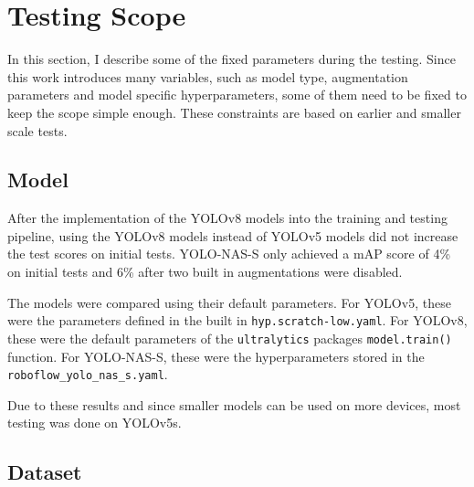 \documentclass[10pt]{book}
\begin{document}
\section{Testing Scope}

In this section, I describe some of the fixed parameters during the testing. Since this work introduces many variables, such as model type, augmentation parameters and model specific hyperparameters, some of them need to be fixed to keep the scope simple enough. These constraints are based on earlier and smaller scale tests.

\subsection{Model}

After the implementation of the \ac{YOLO}v8 models into the training and testing pipeline, using the \ac{YOLO}v8 models instead of \ac{YOLO}v5 models did not increase the test scores on initial tests. \ac{YOLO}-NAS-S only achieved a \ac{mAP} score of 4\% on initial tests and 6\% after two built in augmentations were disabled.

The models were compared using their default parameters. For \ac{YOLO}v5, these were the parameters defined in the built in \texttt{hyp.scratch-low.yaml}. For \ac{YOLO}v8, these were the default parameters of the \texttt{ultralytics} packages \texttt{model.train()} function. For \ac{YOLO}-NAS-S, these were the hyperparameters stored in the \texttt{roboflow\_yolo\_nas\_s.yaml}.


Due to these results and since smaller models can be used on more devices, most testing was done on \ac{YOLO}v5s.

\subsection{Dataset}
\end{document}
